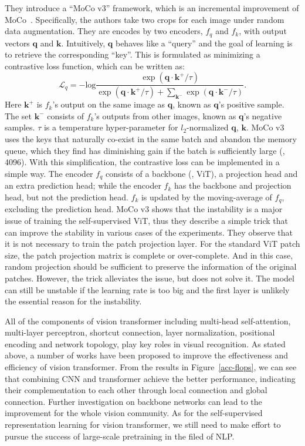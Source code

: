 They introduce a ``MoCo v3'' framework, which is an incremental improvement of MoCo~. Specifically, the authors take two crops for each image under random data augmentation. They are encodes by two encoders, $f_q$ and $f_k$, with output vectors $\mathbf q$ and $\mathbf k$. Intuitively, $\mathbf q$ behaves like a ``query'' and the goal of learning is to retrieve the corresponding ``key''. This is formulated as minimizing a contrastive loss function, which can be written as:
\begin{equation}
\mathcal{L}_q=-\text{log} \frac{\exp(\mathbf q \cdot \mathbf k^+ /\tau)}{\exp(\mathbf q \cdot \mathbf k^+ /\tau)+\sum_{\mathbf k^-} \exp(\mathbf q \cdot \mathbf k^- /\tau)}.
\end{equation}
Here $\mathbf k^+$ is $f_k$'s output on the same image as $\mathbf q$, known as $\mathbf q$'s positive sample. The set {$\mathbf k^-$} consists of $f_k$'s outputs from other images, known as $\mathbf q$'s negative samples. $\tau$ is a temperature hyper-parameter for $l_2$-normalized $\mathbf q$, $\mathbf k$. MoCo v3 uses the keys that naturally co-exist in the same batch and abandon the memory queue, which they find has diminishing gain if the batch is sufficiently large (\eg, 4096). With this simplification, the contrastive loss can be implemented in a simple way. The encoder $f_q$ consists of a backbone (\eg, ViT), a projection head and an extra prediction head; while the encoder $f_k$ has the backbone and projection head, but not the prediction head. $f_k$ is updated by the moving-average of $f_q$, excluding the prediction head.
MoCo v3 shows that the instability is a major issue of training the self-supervised ViT, thus they describe a simple trick that can improve the stability in various cases of the experiments. They observe that it is not necessary to train the patch projection layer. For the standard ViT patch size, the patch projection matrix is complete or over-complete. And in this case, random projection should be sufficient to preserve the information of the original patches. However, the trick alleviates the issue, but does not solve it. The model can still be unstable if the learning rate is too big and the first layer is unlikely the essential reason for the instability.

All of the components of vision transformer including multi-head self-attention, multi-layer perceptron, shortcut connection, layer normalization, positional encoding and network topology, play key roles in visual recognition. As stated above, a number of works have been proposed to improve the effectiveness and efficiency of vision transformer. From the results in Figure~\ref{acc-flops}, we can see that combining CNN and transformer achieve the better performance, indicating their complementation to each other through local connection and global connection. Further investigation on backbone networks can lead to the improvement for the whole vision community. As for the self-supervised representation learning for vision transformer, we still need to make effort to pursue the success of large-scale pretraining in the filed of NLP.


